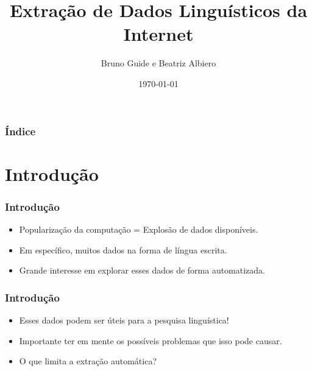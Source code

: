 \documentclass{beamer}
\title[Tardes de Linguística]{Extração de Dados Linguísticos da Internet} %
\author{Bruno Guide e Beatriz Albiero} %
\institute[USP] %
{
Grupo de Estudos de Linguística Computacional - Departamento de Linguística USP \\ %
\medskip
\textit{ling.compdl@gmail.com} %
}
\date{\today} %
\begin{document}
\begin{frame}
\titlepage %
\end{frame}

\begin{frame}
\frametitle{Índice} %
\tableofcontents %
\end{frame}

\section{Introdução}
\begin{frame}
\frametitle{Introdução}
\begin{itemize}
\item<1-> Popularização da computação  = Explosão de dados disponíveis.\\
\item<2-> Em específico, muitos dados na forma de língua escrita.\\
\item<3> Grande interesse em explorar esses dados de forma automatizada.\\
\end{itemize}
\end{frame}
\begin{frame}
\frametitle{Introdução}
\begin{itemize}
\item<1-> Esses dados podem ser úteis para a pesquisa linguística!\\
\item<2-> Importante ter em mente os possíveis problemas que isso pode causar.\\
\item<3> O que limita a extração automática?\\
\end{itemize}
\end{frame}
\end{document}
